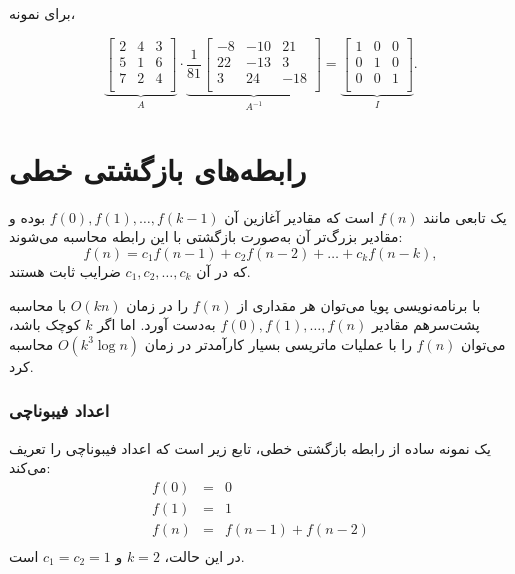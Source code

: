 برای نمونه،

\[
\underbrace{
 \begin{bmatrix}
  2 & 4 & 3\\
  5 & 1 & 6\\
  7 & 2 & 4\\
 \end{bmatrix}
}_{A}
\cdot
\underbrace{
 \frac{1}{81}
 \begin{bmatrix}
   -8 & -10 & 21 \\
   22 & -13 & 3 \\
   3 & 24 & -18 \\
 \end{bmatrix}
}_{A^{-1}}
=
\underbrace{
 \begin{bmatrix}
  1 & 0 & 0 \\
  0 & 1 & 0 \\
  0 & 0 & 1 \\
 \end{bmatrix}
}_{I}.
\]

\section{رابطه‌های بازگشتی خطی}


یک 
تابعی مانند $f(n)$ است
که مقادیر آغازین آن
$f(0),f(1),\ldots,f(k-1)$ بوده
و مقادیر بزرگ‌تر آن
به‌صورت بازگشتی با این رابطه محاسبه می‌شوند:
\[f(n) = c_1 f(n-1) + c_2 f(n-2) + \ldots + c_k f (n-k),\]
که در آن $c_1,c_2,\ldots,c_k$ ضرایب ثابت هستند.

با برنامه‌نویسی پویا می‌توان
هر مقداری از $f(n)$ را در زمان $O(kn)$ با محاسبه
پشت‌سر‌هم مقادیر $f(0),f(1),\ldots,f(n)$ به‌دست آورد.
اما اگر $k$ کوچک باشد، می‌توان
$f(n)$ را با عملیات ماتریسی بسیار کارآمدتر در زمان
$O(k^3 \log n)$ محاسبه کرد.

\subsubsection{اعداد فیبوناچی}


یک نمونه ساده از رابطه بازگشتی خطی،
تابع زیر است که اعداد فیبوناچی را تعریف می‌کند:
\[
\begin{array}{lcl}
f(0) & = & 0 \\
f(1) & = & 1 \\
f(n) & = & f(n-1)+f(n-2) \\
\end{array}
\]
در این حالت، $k=2$ و $c_1=c_2=1$ است.

